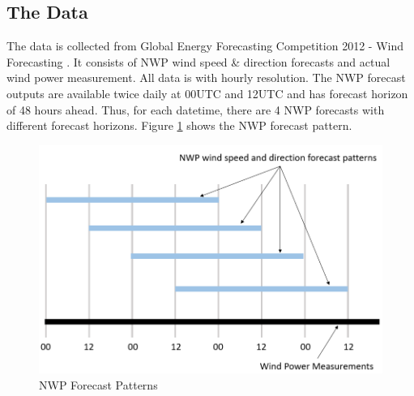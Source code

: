 \documentclass[conference]{IEEEtran}
\begin{document}
\subsection{The Data}
The data is collected from Global Energy Forecasting Competition 2012 - Wind Forecasting \cite{HONG2014357}. It consists of NWP wind speed \& direction forecasts and actual wind power measurement. %
All data is with hourly resolution. The NWP forecast outputs are available twice daily at 00UTC and 12UTC and has forecast horizon of 48 hours ahead. Thus, for each datetime, there are 4 NWP forecasts with different forecast horizons. Figure \ref{fig:pattern} shows the NWP forecast pattern.

\begin{figure}
\centering
\includegraphics[width=0.7\columnwidth]{FIG/pattern}
\caption{NWP Forecast Patterns}
\label{fig:pattern}
\end{figure}
\end{document}
